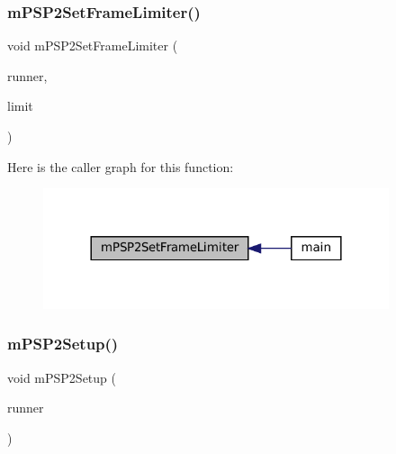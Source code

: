\subsubsection{\texorpdfstring{m\+P\+S\+P2\+Set\+Frame\+Limiter()}{mPSP2SetFrameLimiter()}}
{\footnotesize\ttfamily void m\+P\+S\+P2\+Set\+Frame\+Limiter (\begin{DoxyParamCaption}\item[{struct \mbox{\hyperlink{structm_g_u_i_runner}{m\+G\+U\+I\+Runner}} $\ast$}]{runner,  }\item[{\mbox{\hyperlink{libretro_8h_a4a26dcae73fb7e1528214a068aca317e}{bool}}}]{limit }\end{DoxyParamCaption})}

Here is the caller graph for this function\+:
\nopagebreak
\begin{figure}[H]
\begin{center}
\leavevmode
\includegraphics[width=288pt]{psp2-context_8h_a9a298ef5f14d11b2cf482a19a3a55d82_icgraph}
\end{center}
\end{figure}
\mbox{\label{psp2-context_8h_a421c14012a9792c249822f943155921a}} 
\subsubsection{\texorpdfstring{m\+P\+S\+P2\+Setup()}{mPSP2Setup()}}
{\footnotesize\ttfamily void m\+P\+S\+P2\+Setup (\begin{DoxyParamCaption}\item[{struct \mbox{\hyperlink{structm_g_u_i_runner}{m\+G\+U\+I\+Runner}} $\ast$}]{runner }\end{DoxyParamCaption})}

